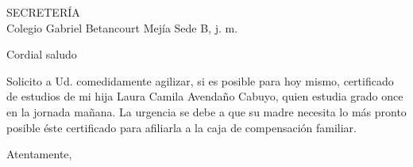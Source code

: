 \documentclass[letterpaper,spanish]{letter}
\begin{document}
\begin{letter}{SECRETERÍA\\Colegio Gabriel Betancourt Mejía Sede B, j. m.}
	
\opening{Cordial saludo}
Solicito a Ud. comedidamente agilizar, si es posible para hoy mismo, certificado de estudios de mi hija Laura Camila Avendaño Cabuyo, quien estudia grado once en la jornada mañana. La urgencia se debe a que su madre necesita lo más pronto posible éste certificado para afiliarla a la caja de compensación familiar.
\closing{Atentamente,}


\end{letter}
\end{document}
